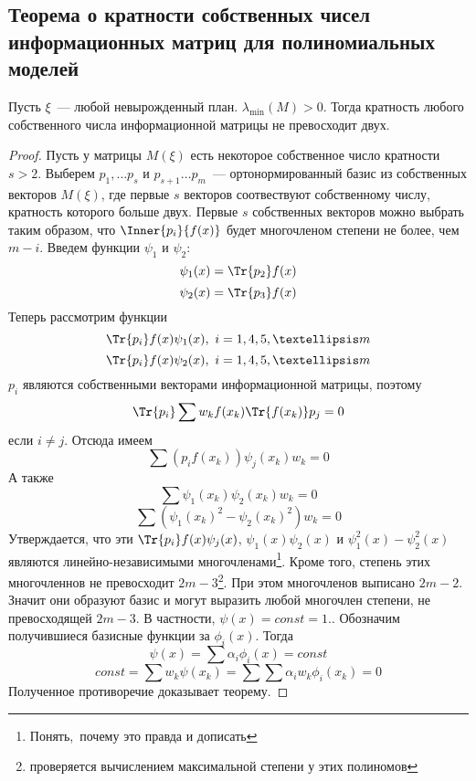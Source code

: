  \subsection{Теорема о кратности собственных чисел информационных матриц для полиномиальных моделей}
 \begin{thm}
Пусть $\xi$ — любой невырожденный план. $\lambda_{\min}(M) > 0$. Тогда кратность любого собственного числа информационной матрицы не превосходит двух.
 \end{thm}
 \begin{proof}
Пусть у матрицы $M(\xi)$ есть некоторое собственное число кратности $s > 2$. Выберем $p_1,…p_s$ и $p_{s+1}…p_m$ — ортонормированный базис из собственных векторов $M(\xi)$, где первые $s$ векторов соотвествуют собственному числу, кратность которого больше двух. Первые $s$ собственных векторов можно выбрать таким образом, что
$\Inner{p_i}{f(x)}$ будет многочленом степени не более, чем $m-i$. Введем функции $\psi_1$ и $\psi_2$:
$$ \psi_1(x) = \Tr{p_2}f(x)$$
$$ \psi_2(x) = \Tr{p_3}f(x)$$
Теперь рассмотрим функции
$$\Tr{p_i}f(x) \psi_1(x), i = 1, 4,5,…m$$
$$\Tr{p_i}f(x) \psi_2(x), i = 1, 4,5,…m$$
$p_i$ являются собственными векторами информационной матрицы, поэтому
$$\Tr{p_i} \sum w_k f(x_k)\Tr{f(x_k)}p_j = 0$$
если $i \neq j$. Отсюда имеем
$$ \sum (p_i f(x_k)) \psi_j(x_k) w_k = 0$$
А также 
$$\sum \psi_1(x_k)\psi_2(x_k) w_k = 0$$
$$\sum (\psi_1(x_k)^2 - \psi_2(x_k)^2) w_k = 0$$
Утверждается, что эти $\Tr{p_i}f(x)\psi_j(x)$, $\psi_1(x)\psi_2(x)$ и $\psi_1^2(x) - \psi_2^2(x)$ являются линейно-независимыми многочленами\footnote{Понять, почему это правда и дописать}. Кроме того, степень этих многочленнов не превосходит $2m-3$\footnote{проверяется вычислением максимальной степени у этих полиномов}. При этом многочленов выписано $2m-2$. Значит они образуют базис и могут выразить любой многочлен степени, не превосходящей $2m-3$. В частности, $\psi(x) = const = 1.$. Обозначим получившиеся базисные функции за $\phi_i(x)$. Тогда 
$$\psi(x) = \sum \alpha_i \phi_i(x) = const$$
$$const = \sum w_k \psi(x_k) = \sum \sum \alpha_i w_k \phi_i(x_k) = 0$$
Полученное противоречие доказывает теорему.
 \end{proof}


